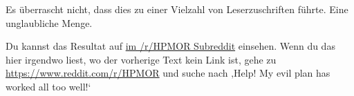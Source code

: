 {%
Es überrascht nicht, dass dies zu einer Vielzahl von Leserzuschriften führte. Eine unglaubliche Menge.

Du kannst das Resultat auf \href{https://www.reddit.com/r/HPMOR/comments/2xnyi0/113_help_my_evil_plan_has_worked_all_too_well/}{im /r/HPMOR Subreddit} einsehen.
Wenn du das hier irgendwo liest, wo der vorherige Text kein Link ist, gehe zu \url{https://www.reddit.com/r/HPMOR} und suche nach ‚Help! My evil plan has worked all too well!‘

}
